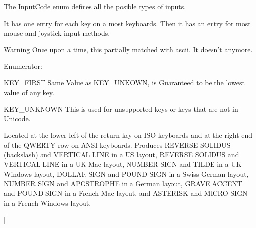 The InputCode enum defines all the posible types of inputs. 

It has one entry for each key on a most keyboards. Then it has an entry for most mouse and joystick input methods. \begin{DoxyWarning}{Warning}
Once upon a time, this partially matched with ascii. It doesn't anymore. 
\end{DoxyWarning}
\begin{Desc}
\item[Enumerator: ]\par
\begin{description}
\item[{\em 
\hypertarget{classphys_1_1MetaCode_a3e501cbb5bf0f6f1fdb7211465bda8d8a45d7f3824a440f5bea5e616a6d6ea0b5}{
KEY\_\-FIRST}
\label{da/dc9/classphys_1_1MetaCode_a3e501cbb5bf0f6f1fdb7211465bda8d8a45d7f3824a440f5bea5e616a6d6ea0b5}
}]KEY\_\-FIRST Same Value as KEY\_\-UNKOWN, is Guaranteed to be the lowest value of any key. \item[{\em 
\hypertarget{classphys_1_1MetaCode_a3e501cbb5bf0f6f1fdb7211465bda8d8a061a36c9b5d9661314fd9d276b33042f}{
KEY\_\-UNKNOWN}
\label{da/dc9/classphys_1_1MetaCode_a3e501cbb5bf0f6f1fdb7211465bda8d8a061a36c9b5d9661314fd9d276b33042f}
}]KEY\_\-UNKNOWN This is used for unsupported keys or keys that are not in Unicode. \item[{\em 
\hypertarget{classphys_1_1MetaCode_a3e501cbb5bf0f6f1fdb7211465bda8d8acab0c272975d1667521cd5ae918e9b8e}{
KEY\_\-BACKSLASH}
\label{da/dc9/classphys_1_1MetaCode_a3e501cbb5bf0f6f1fdb7211465bda8d8acab0c272975d1667521cd5ae918e9b8e}
}]Located at the lower left of the return key on ISO keyboards and at the right end of the QWERTY row on ANSI keyboards. Produces REVERSE SOLIDUS (backslash) and VERTICAL LINE in a US layout, REVERSE SOLIDUS and VERTICAL LINE in a UK Mac layout, NUMBER SIGN and TILDE in a UK Windows layout, DOLLAR SIGN and POUND SIGN in a Swiss German layout, NUMBER SIGN and APOSTROPHE in a German layout, GRAVE ACCENT and POUND SIGN in a French Mac layout, and ASTERISK and MICRO SIGN in a French Windows layout. \item[{\em 
}
\end{description}
\end{Desc}
